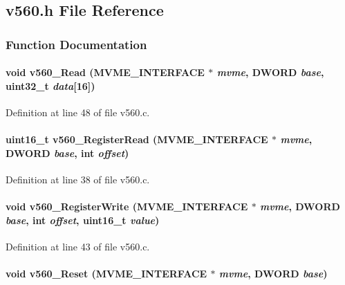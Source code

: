\subsection{v560.h File Reference}
\label{v560_8h}


\subsubsection{Function Documentation}
\paragraph[{v560\_\-Read}]{\setlength{\rightskip}{0pt plus 5cm}void v560\_\-Read ({\bf MVME\_\-INTERFACE} $\ast$ {\em mvme}, \/  {\bf DWORD} {\em base}, \/  uint32\_\-t {\em data}\mbox{[}16\mbox{]})}\hfill\label{v560_8h_a3d40e677386cd39e9f29d40bd21dada3}


Definition at line 48 of file v560.c.
\paragraph[{v560\_\-RegisterRead}]{\setlength{\rightskip}{0pt plus 5cm}uint16\_\-t v560\_\-RegisterRead ({\bf MVME\_\-INTERFACE} $\ast$ {\em mvme}, \/  {\bf DWORD} {\em base}, \/  int {\em offset})}\hfill\label{v560_8h_ad56bcbcf69a61c422e3a92b69e348376}


Definition at line 38 of file v560.c.
\paragraph[{v560\_\-RegisterWrite}]{\setlength{\rightskip}{0pt plus 5cm}void v560\_\-RegisterWrite ({\bf MVME\_\-INTERFACE} $\ast$ {\em mvme}, \/  {\bf DWORD} {\em base}, \/  int {\em offset}, \/  uint16\_\-t {\em value})}\hfill\label{v560_8h_ae16ee0157660e998432d1070839ffad1}


Definition at line 43 of file v560.c.
\paragraph[{v560\_\-Reset}]{\setlength{\rightskip}{0pt plus 5cm}void v560\_\-Reset ({\bf MVME\_\-INTERFACE} $\ast$ {\em mvme}, \/  {\bf DWORD} {\em base})}\hfill\label{v560_8h_a9299f3b2aa39f62abbe6deb487416029}


